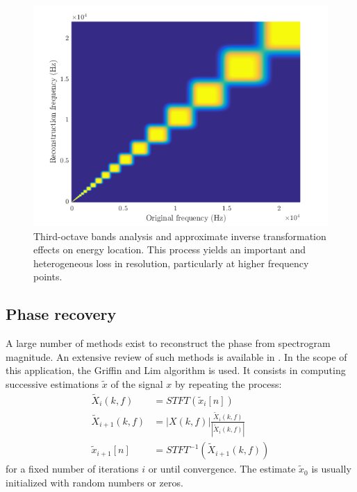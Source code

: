 \documentclass[12pt,times,onecolumn]{article}
\begin{document}
\begin{figure}[htbp]
	\centering
		\includegraphics[width=0.7\columnwidth]{figures/freq.png}
	\caption{Third-octave bands analysis and approximate inverse transformation effects on energy location. This process yields an important and heterogeneous loss in resolution, particularly at higher frequency points.}
	\label{fig:freq}
\end{figure}

\subsection{Phase recovery}
A large number of methods exist to reconstruct the phase from spectrogram magnitude. An extensive review of such methods is available in \cite{sturmel2011}. In the scope of this application, the Griffin and Lim algorithm \cite{griffin1984} is used. It consists in computing successive estimations $\tilde{x}$ of the signal $x$ by repeating the process:
\begin{align}
\tilde{X}_{i}(k, f) &= STFT(\tilde{x}_{i}[n])\\
\tilde{X}_{i+1}(k, f) &= |X(k, f)|\frac{\tilde{X}_{i}(k, f)}{|\tilde{X}_{i}(k, f)|}\\
\tilde{x}_{i+1}[n] &= STFT^{-1}(\tilde{X}_{i+1}(k, f))
\end{align}
for a fixed number of iterations $i$ or until convergence. The estimate $\tilde{x}_0$ is usually initialized with random numbers or zeros.


\clearpage






\end{document}
